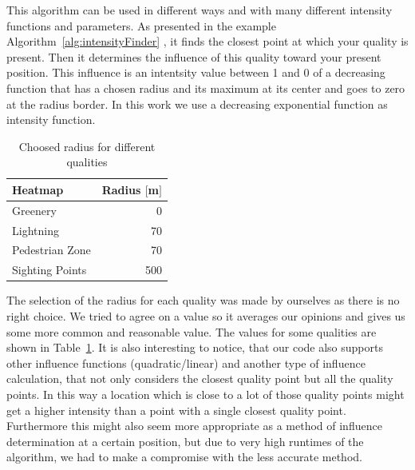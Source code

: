\documentclass[letterpaper]{article}
\begin{document}
\indent This algorithm can be used in different ways and with many different intensity functions and parameters. 
As presented in the example Algorithm~\ref{alg:intensityFinder} , it finds the closest point at which your quality 
is present. Then it determines the influence of this quality toward your present position. This influence is an intentsity 
value between 1 and 0 of a decreasing function that has a chosen radius and its maximum at its center and goes to zero 
at the radius border. In this work we use a decreasing exponential function as intensity function.

\begin{table}[htb]
    \centering
    \caption{Choosed radius for different qualities}
    \label{table:RadiusParam}
        \begin{tabular}{lr}
            Heatmap & Radius $[$m$]$\\\hline
            Greenery & 0\\
            Lightning & 70\\
            Pedestrian Zone & 70\\
            Sighting Points & 500\\
    \end{tabular}
\end{table}

\indent The selection of the radius for each quality was made by ourselves as there is no right choice. 
We tried to agree on a value so it averages our opinions and gives us some more common and reasonable value. 
The values for some qualities are shown in Table~\ref{table:RadiusParam}. It is also interesting to notice, 
that our code also supports other influence functions (quadratic/linear) and another type of influence calculation, 
that not only considers the closest quality point but all the quality points. In this way a location which is close 
to a lot of those quality points might get a higher intensity than a point with a single closest quality point. 
Furthermore this might also seem more appropriate as a method of influence determination at a certain position, 
but due to very high runtimes of the algorithm, we had to make a compromise with the less accurate method.
\end{document}
